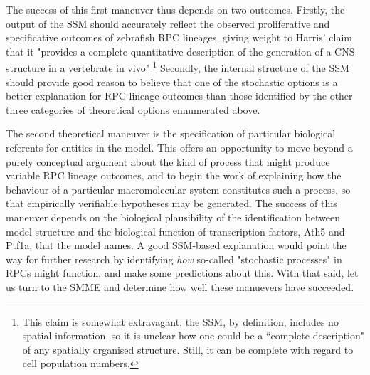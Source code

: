 The success of this first maneuver thus depends on two outcomes. Firstly, the output of the SSM should accurately reflect the observed proliferative and specificative outcomes of zebrafish RPC lineages, giving weight to Harris' claim that it "provides a complete quantitative description of the generation of a CNS structure in a vertebrate in vivo" \cite{He2012}\footnote{This claim is somewhat extravagant; the SSM, by definition, includes no spatial information, so it is unclear how one could be a ``complete description" of any spatially organised structure. Still, it can be complete with regard to cell population numbers.} Secondly, the internal structure of the SSM should provide good reason to believe that one of the stochastic options is a better explanation for RPC lineage outcomes than those identified by the other three categories of theoretical options ennumerated above.

The second theoretical maneuver is the specification of particular biological referents for entities in the model. This offers an opportunity to move beyond a purely conceptual argument about the kind of process that might produce variable RPC lineage outcomes, and to begin the work of explaining how the behaviour of a particular macromolecular system constitutes such a process, so that empirically verifiable hypotheses may be generated. The success of this maneuver depends on the biological plausibility of the identification between model structure and the biological function of transcription factors, Ath5 and Ptf1a, that the model names. A good SSM-based explanation would point the way for further research by identifying \textit{how} so-called "stochastic processes" in RPCs might function, and make some predictions about this. With that said, let us turn to the SMME and determine how well these manuevers have succeeded.